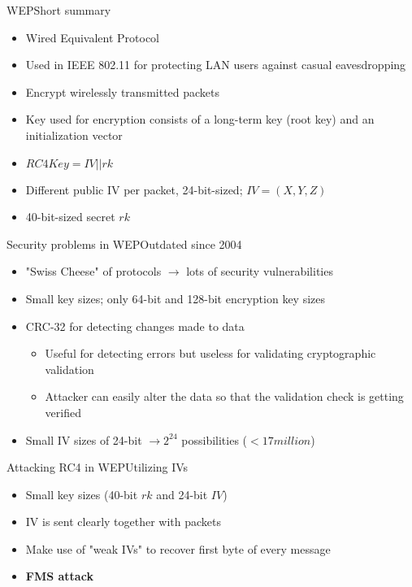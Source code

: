 \documentclass[
	aspectratio=169,	%
	onlytextwidth,		%
	t,					%
	]{beamer}
\begin{document}
\begin{frame}[fragile]{WEP}{Short summary}
	\begin{itemize}
		\item Wired Equivalent Protocol
		\item Used in IEEE 802.11 for protecting LAN users against casual eavesdropping
		\item Encrypt wirelessly transmitted packets
		\item Key used for encryption consists of a long-term key (root key) and an initialization vector
		\item $RC4Key = IV||rk$
		\item Different public IV per packet, 24-bit-sized; $IV=(X,Y,Z)$
		\item 40-bit-sized secret $rk$
	\end{itemize}
\end{frame}

\begin{frame}[fragile]{Security problems in WEP}{Outdated since 2004}
	\begin{itemize}
		\item "Swiss Cheese" of protocols $\rightarrow$ lots of security vulnerabilities
		\item Small key sizes; only 64-bit and 128-bit encryption key sizes
		\item CRC-32 for detecting changes made to data
		\begin{itemize}
		\item Useful for detecting errors but useless for validating cryptographic validation
		\item Attacker can easily alter the data so that the validation check is getting verified
		\end{itemize}
		\item Small IV sizes of 24-bit $\rightarrow 2^{24}$ possibilities ($<17 million$)
	\end{itemize}
\end{frame}

\begin{frame}[fragile]{Attacking RC4 in WEP}{Utilizing IVs}
	\begin{itemize}
		\item Small key sizes (40-bit $rk$ and 24-bit $IV$) \cite{stovsic2012rc4}
		\item IV is sent clearly together with packets
		\item Make use of "weak IVs" to recover first byte of every message
		\item \textbf{FMS attack}
	\end{itemize}
\end{frame}
\end{document}
